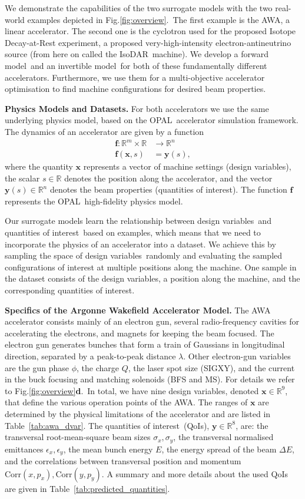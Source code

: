 \documentclass[a4paper, 12pt, version-1-compatibility]{article}
\def\forwardmodel{forward model}
\def\invertiblemodel{invertible model}
\def\isodar{IsoDAR}
\def\opal{OPAL}
\def\dvars{design variables}
\def\qois{quantities of interest}
\newcommand{\figref}[1]{Fig.\xspace\ref{#1}}
\newcommand{\tabref}[1]{Table~\ref{#1}}
\newcommand{\myvec}[1]{\mathbf{#1}}
\begin{document}
We demonstrate the capabilities of the two surrogate models with 
 the two real-world examples depicted in \figref{fig:overview}.\ The first example is the AWA, a linear accelerator. The second one is the cyclotron used for the proposed Isotope Decay-at-Rest experiment, a proposed very-high-intensity  electron-antineutrino source (from here on called the \isodar\ machine). We develop a \forwardmodel\ and an \invertiblemodel\ for both of these fundamentally different accelerators. Furthermore, we use them for a multi-objective accelerator optimisation to find machine configurations for desired beam properties. 

{\bf Physics Models and Datasets.}
For both accelerators we use the same underlying physics model, based on the \opal\ accelerator simulation framework. The dynamics of an accelerator are given by a function
\begin{align*}
    \myvec{f}: \mathbb{R}^m \times \mathbb{R} &\rightarrow \mathbb{R}^n\\
    \myvec{f}(\myvec{x}, s) &= \myvec{y}(s),
\end{align*}
where the quantity $\myvec{x}$ represents a vector of machine settings (\dvars), the scalar $s \in \mathbb{R}$ denotes the position along the accelerator, and the vector $\myvec{y}(s) \in \mathbb{R}^n$ denotes the beam properties (\qois). The function 
$\myvec{f}$ represents the \opal\ high-fidelity physics model.

Our surrogate models learn the relationship between \dvars\ and \qois\ based on examples, which means that we need to incorporate the physics of an accelerator into a dataset. We achieve this by sampling the space of \dvars\ randomly and evaluating the sampled configurations of interest at multiple positions along the machine. One sample in the dataset consists of the \dvars, a position along the machine, and the corresponding \qois. 

{\bf Specifics of the Argonne Wakefield Accelerator Model.}
The AWA accelerator \cite{AWAPower} consists mainly of an electron gun, several radio-frequency cavities for accelerating the electrons, and magnets for keeping the beam focused. The electron gun generates bunches that form a train of Gaussians in longitudinal direction, separated by a peak-to-peak distance $\lambda$. Other electron-gun variables are the gun phase $\phi$, the charge $Q$, the laser spot size (SIGXY), and the current in the buck focusing and matching solenoids (BFS and MS). 
For details we refer to \figref{fig:overview}{\bf{d}}.\
 In total, we have nine \dvars, denoted $\myvec{x} \in \mathbb{R}^9$, that define the various operation points of the AWA. The ranges of $\myvec{x}$ are determined by the physical limitations of the accelerator and are listed in \tabref{tab:awa_dvar}. The \qois\ (QoIs), $\myvec{y} \in \mathbb{R}
^{8}$, are: the transversal root-mean-square beam sizes $\sigma_x, \sigma_y$, the transversal normalised emittances $\epsilon_x, \epsilon_y$, the mean bunch energy $E$, the energy spread of the beam $\Delta E$, and the correlations between transversal position and momentum $\mathrm{Corr}(x, p_x), \mathrm{Corr}(y, p_y)$. A summary and more details about the used QoIs are given in \tabref{tab:predicted_quantities}. 
\end{document}
